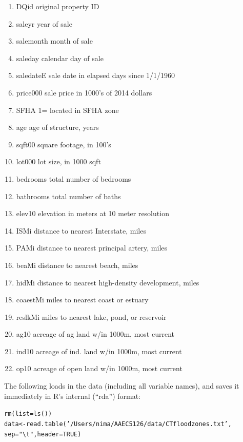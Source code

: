 \documentclass[11pt,reqno]{amsart}\usepackage[]{graphicx}\usepackage[]{color}
\makeatletter
\newcommand{\hlnum}[1]{\textcolor[rgb]{0.063,0.58,0.627}{#1}}%
\newcommand{\hlstr}[1]{\textcolor[rgb]{0.063,0.58,0.627}{#1}}%
\newcommand{\hlstd}[1]{\textcolor[rgb]{0.196,0.196,0.196}{#1}}%
\newcommand{\hlkwb}[1]{\textcolor[rgb]{0.627,0,0.314}{#1}}%
\newcommand{\hlkwc}[1]{\textcolor[rgb]{0,0.631,0.314}{#1}}%
\newcommand{\hlkwd}[1]{\textcolor[rgb]{0.78,0.227,0.412}{#1}}%
\newenvironment{kframe}{%
 \def\at@end@of@kframe{}%
 \ifinner\ifhmode%
  \def\at@end@of@kframe{\end{minipage}}%
  \begin{minipage}{\columnwidth}%
 \fi\fi%
 \def\FrameCommand##1{\hskip\@totalleftmargin \hskip-\fboxsep
 \colorbox{shadecolor}{##1}\hskip-\fboxsep
     \hskip-\linewidth \hskip-\@totalleftmargin \hskip\columnwidth}%
 \MakeFramed {\advance\hsize-\width
   \@totalleftmargin\z@ \linewidth\hsize
   \@setminipage}}%
 {\par\unskip\endMakeFramed%
 \at@end@of@kframe}
\newenvironment{knitrout}{}{} %
\newcommand{\ksp}{\vspace{0.1in}}   %
\makeatother
\begin{document}
\begin{enumerate}
\item DQid            original property ID
\item saleyr          year of sale
\item salemonth       month of sale
\item saleday         calendar day of sale
\item saledateE       sale date in elapsed days since 1/1/1960
\item price000        sale price in 1000's of 2014 dollars
\item SFHA            1= located in SFHA zone
\item age             age of structure, years
\item sqft00          square footage, in 100's
\item lot000          lot size, in 1000 sqft
\item bedrooms        total number of bedrooms
\item bathrooms       total number of baths
\item elev10          elevation in meters at 10 meter resolution
\item ISMi            distance to nearest Interstate, miles
\item PAMi            distance to nearest principal artery, miles
\item beaMi           distance to nearest beach, miles
\item hidMi           distance to nearest high-density development, miles
\item coaestMi        miles to nearest coast or estuary                
\item reslkMi         miles to nearest lake, pond, or reservoir
\item ag10            acreage of ag land w/in 1000m, most current
\item ind10           acreage of ind. land w/in 1000m, most current
\item op10            acreage of open land w/in 1000m, most current
\end{enumerate}


The following loads in the data (including all variable names), and saves it immediately in R's internal (``rda'') format:

\ksp
\begin{knitrout}
\color{fgcolor}\begin{kframe}
\begin{alltt}
\hlkwd{rm}\hlstd{(}\hlkwc{list}\hlstd{=}\hlkwd{ls}\hlstd{())}
\hlstd{data} \hlkwb{<-} \hlkwd{read.table}\hlstd{(}\hlstr{'/Users/nima/AAEC5126/data/CTfloodzones.txt'}\hlstd{,}
                   \hlkwc{sep} \hlstd{=} \hlstr{"\textbackslash{}t"}\hlstd{,} \hlkwc{header} \hlstd{=} \hlnum{TRUE}\hlstd{)}
\end{alltt}
\end{kframe}
\end{knitrout}
\ksp
\end{document}
